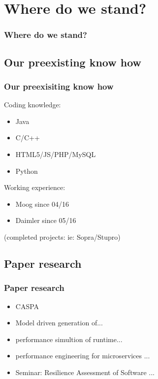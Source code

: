 \documentclass[xcolor=dvipsnames]{beamer}
\begin{document}
\section{Where do we stand?}
\begin{frame}
	\frametitle{Where do we stand?}
	
\end{frame}


\subsection{Our preexisting know how}
\begin{frame}
	\frametitle{Our preexisiting know how}
	
	Coding knowledge:
	\begin{itemize}
		\item Java
		\item C/C++
		\item HTML5/JS/PHP/MySQL
		\item Python
	\end{itemize}
	
	Working experience:
	\begin{itemize}
		\item Moog since 04/16
		\item Daimler since 05/16
	\end{itemize}
	
	(completed projects: ie: Sopra/Stupro)
	
\end{frame}


\subsection{Paper research}
\begin{frame}
	\frametitle{Paper research}
	
	\begin{itemize}
		\item CASPA
		\item Model driven generation of...
		\item performance simultion of runtime...
		\item performance engineering for microservices ...\newline
		\item Seminar: Resilience Assessment of Software ...
	\end{itemize}
	
\end{frame}
\end{document}
